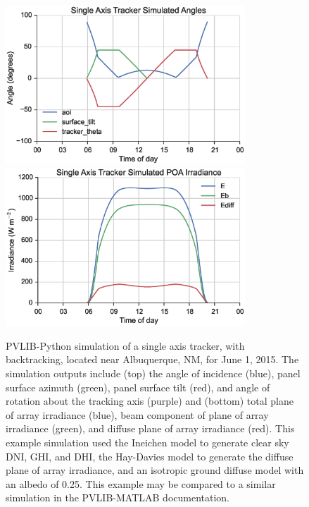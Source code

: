 \documentclass[conference]{IEEEtran}
\begin{document}
\begin{figure}
\includegraphics[width=9cm]{abq-tracker.eps}
\includegraphics[width=9cm]{abq-tracker-irrad.eps}
\caption{\label{tracker}PVLIB-Python simulation of a single axis tracker, with backtracking, located near Albuquerque, NM, for June 1, 2015. The simulation outputs include (top) the angle of incidence (blue), panel surface azimuth (green), panel surface tilt (red), and angle of rotation about the tracking axis (purple) and (bottom) total plane of array irradiance (blue), beam component of plane of array irradiance (green), and diffuse plane of array irradiance (red). This example simulation used the Ineichen model to generate clear sky DNI, GHI, and DHI, the Hay-Davies model to generate the diffuse plane of array irradiance, and an isotropic ground diffuse model with an albedo of 0.25. This example may be compared to a similar simulation in the PVLIB-MATLAB documentation.}
\end{figure}
\end{document}

